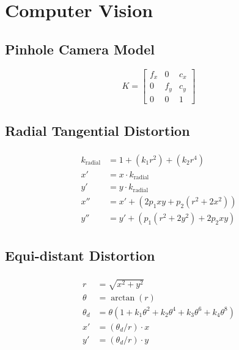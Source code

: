 \chapter{Computer Vision}

\section{Pinhole Camera Model}

\begin{equation}
  K =
  \begin{bmatrix}
    f_x & 0 & c_x \\
    0 & f_y & c_y \\
    0 & 0 & 1
  \end{bmatrix}
\end{equation}



\section{Radial Tangential Distortion}

\begin{align}
\begin{split}
  k_{\text{radial}} &= 1 + (k_1 r^2) + (k_2 r^4) \\
  x' &= x \cdot k_{\text{radial}} \\
  y' &= y \cdot k_{\text{radial}} \\
  x'' &= x' + (2 p_1 x y + p_2 (r^2 + 2 x^2)) \\
  y'' &= y' + (p_1 (r^2 + 2 y^2) + 2 p_2 x y)
\end{split}
\end{align}



\section{Equi-distant Distortion}

\begin{align}
\begin{split}
  r &= \sqrt{x^{2} + y^{2}} \\
  \theta &= \arctan{(r)} \\
  \theta_d &= \theta (1 + k_1 \theta^2 + k_2 \theta^4 + k_3 \theta^6 + k_4 \theta^8) \\
  x' &= (\theta_d / r) \cdot x \\
  y' &= (\theta_d / r) \cdot y
\end{split}
\end{align}



